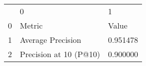\begin{tabular}{lll}
 & 0 & 1 \\
0 & Metric & Value \\
1 & Average Precision & 0.951478 \\
2 & Precision at 10 (P@10) & 0.900000 \\
\end{tabular}
